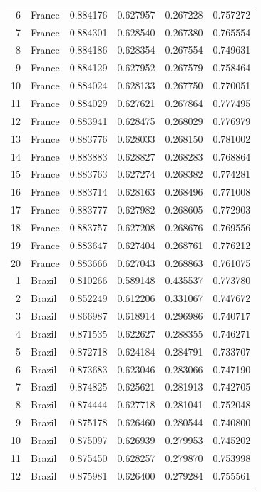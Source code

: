 \begin{tabular}{rlrrrr}
6 & France & 0.884176 & 0.627957 & 0.267228 & 0.757272 \\
7 & France & 0.884301 & 0.628540 & 0.267380 & 0.765554 \\
8 & France & 0.884186 & 0.628354 & 0.267554 & 0.749631 \\
9 & France & 0.884129 & 0.627952 & 0.267579 & 0.758464 \\
10 & France & 0.884024 & 0.628133 & 0.267750 & 0.770051 \\
11 & France & 0.884029 & 0.627621 & 0.267864 & 0.777495 \\
12 & France & 0.883941 & 0.628475 & 0.268029 & 0.776979 \\
13 & France & 0.883776 & 0.628033 & 0.268150 & 0.781002 \\
14 & France & 0.883883 & 0.628827 & 0.268283 & 0.768864 \\
15 & France & 0.883763 & 0.627274 & 0.268382 & 0.774281 \\
16 & France & 0.883714 & 0.628163 & 0.268496 & 0.771008 \\
17 & France & 0.883777 & 0.627982 & 0.268605 & 0.772903 \\
18 & France & 0.883757 & 0.627208 & 0.268676 & 0.769556 \\
19 & France & 0.883647 & 0.627404 & 0.268761 & 0.776212 \\
20 & France & 0.883666 & 0.627043 & 0.268863 & 0.761075 \\
1 & Brazil & 0.810266 & 0.589148 & 0.435537 & 0.773780 \\
2 & Brazil & 0.852249 & 0.612206 & 0.331067 & 0.747672 \\
3 & Brazil & 0.866987 & 0.618914 & 0.296986 & 0.740717 \\
4 & Brazil & 0.871535 & 0.622627 & 0.288355 & 0.746271 \\
5 & Brazil & 0.872718 & 0.624184 & 0.284791 & 0.733707 \\
6 & Brazil & 0.873683 & 0.623046 & 0.283066 & 0.747190 \\
7 & Brazil & 0.874825 & 0.625621 & 0.281913 & 0.742705 \\
8 & Brazil & 0.874444 & 0.627718 & 0.281041 & 0.752048 \\
9 & Brazil & 0.875178 & 0.626460 & 0.280544 & 0.740800 \\
10 & Brazil & 0.875097 & 0.626939 & 0.279953 & 0.745202 \\
11 & Brazil & 0.875450 & 0.628257 & 0.279870 & 0.753998 \\
12 & Brazil & 0.875981 & 0.626400 & 0.279284 & 0.755561 \\

\end{tabular}
